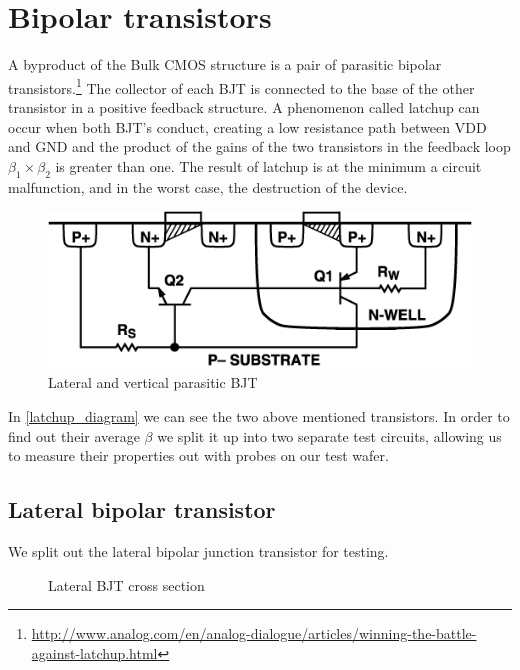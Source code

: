 \section{Bipolar transistors}
A byproduct of the Bulk CMOS structure is a pair of parasitic bipolar transistors.\footnote{\url{http://www.analog.com/en/analog-dialogue/articles/winning-the-battle-against-latchup.html}}
The collector of each BJT is connected to the base of the other transistor in a positive feedback structure.
A phenomenon called latchup can occur when both BJT's conduct, creating a low resistance path between VDD and GND and the product of the gains of the two transistors in the feedback loop $\beta_1 \times \beta_2$ is greater than one.
The result of latchup is at the minimum a circuit malfunction, and in the worst case, the destruction of the device.

\begin{figure}[H]
	\centering
	\includegraphics[scale=0.5]{latchup_cross.png}
	\caption{Lateral and vertical parasitic BJT}
	\label{latchup_diagram}
\end{figure}

In \autoref{latchup_diagram} we can see the two above mentioned transistors. In order to find out their average $\beta$ we split it up into two separate test circuits, allowing us to measure their properties out with probes on our test wafer.

\subsection{Lateral bipolar transistor}

We split out the lateral bipolar junction transistor for testing.

\begin{figure}[H]
	\centering
	\begin{tikzpicture}[node distance = 3cm, auto, thick,scale=0.5, every node/.style={transform shape}]
		
	\end{tikzpicture}
	\caption{Lateral BJT cross section}
	\label{lateral_bjt_cross_section}
\end{figure}

